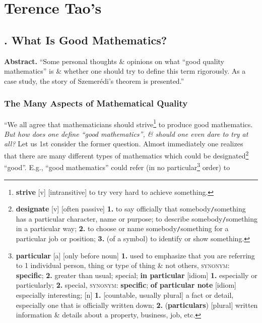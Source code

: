 \documentclass[oneside]{book}
\numberwithin{equation}{section}
\begin{document}
\chapter{Terence Tao's}

\section{\cite{Tao2007}. What Is Good Mathematics?}

\textbf{Abstract.} ``Some personal thoughts \& opinions on what ``good quality mathematics'' is \& whether one should try to define this term rigorously. As a case study, the story of Szemer\'edi's theorem is presented.''

\subsection{The Many Aspects of Mathematical Quality}
``We all agree that mathematicians should strive\footnote{\textbf{strive} [v] [intransitive] to try very hard to achieve something.} to produce good mathematics. \textit{But how does one define ``good mathematics'', \& should one even dare to try at all?} Let us 1st consider the former question. Almost immediately one realizes that there are many different types of mathematics which could be designated\footnote{\textbf{designate} [v] [often passive] \textbf{1.} to say officially that somebody\texttt{/}something has a particular character, name or purpose; to describe somebody\texttt{/}something in a particular way; \textbf{2.} to choose or name somebody\texttt{/}something for a particular job or position; \textbf{3.} (of a symbol) to identify or show something.} ``good''. E.g., ``good mathematics'' could refer (in no particular\footnote{\textbf{particular} [a] [only before noun] \textbf{1.} used to emphasize that you are referring to 1 individual person, thing or type of thing \& not others, \textsc{synonym}: \textbf{specific}; \textbf{2.} greater than usual; special; \textbf{in particular} [idiom] \textbf{1.} especially or particularly; \textbf{2.} special, \textsc{synonym}: \textbf{specific}; \textbf{of particular note} [idiom] especially interesting; [n] \textbf{1.} [countable, usually plural] a fact or detail, especially one that is officially written down; \textbf{2.} (\textbf{particulars}) [plural] written information \& details about a property, business, job, etc.} order) to
\end{document}
